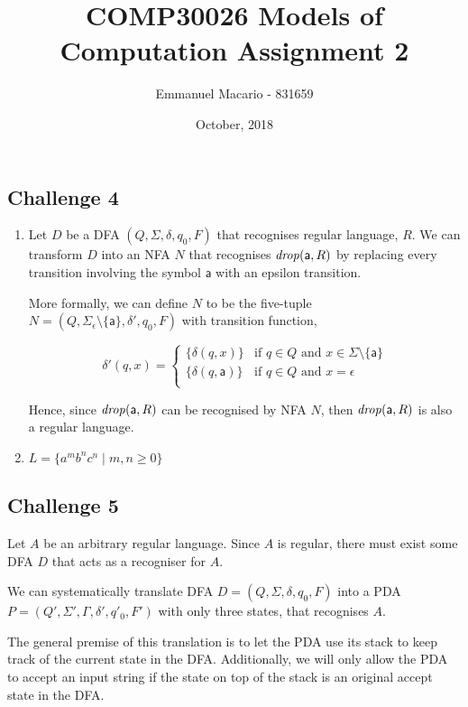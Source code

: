 \documentclass[12pt]{article}
\author{Emmanuel Macario - 831659}
\title{COMP30026 Models of Computation Assignment 2}
\date{October, 2018}
\newcommand{\id}[1]{\mbox{\textit{#1}}}
\newcommand{\ma}{\mathsf{a}}
\begin{document}
\maketitle

\subsection*{Challenge 4}

\begin{enumerate}
\item
Let $D$ be a DFA $(Q,\Sigma,\delta,q_0,F)$ that recognises regular language, $R$. We can transform 
$D$ into an NFA $N$ that recognises $\id{drop}(\ma,R)$ by replacing every transition involving the symbol
$\ma$ with an epsilon transition.

\bigskip
\noindent
More formally, we can define $N$ to be the five-tuple $N=(Q,\Sigma_\epsilon \setminus \{\ma\},\delta',q_0,F)$
with transition function,

\[
  \delta'(q, x) =
  \begin{cases}
  	\{\delta (q, x)\}     & \text{if $q \in Q$ and $x \in \Sigma \setminus \{\ma\}$} \\
      \{\delta (q, \ma)\} & \text{if $q \in Q$ and $x = \epsilon$} \\
  \end{cases}
\]

\bigskip
\noindent
Hence, since $\id{drop}(\ma,R)$ can be recognised by NFA $N$, then $\id{drop}(\ma,R)$ is also a regular language.

\item $L=\{a^m b^n c^n \mid m, n \geq 0\}$
\end{enumerate}


\subsection*{Challenge 5}

Let $A$ be an arbitrary regular language. Since $A$ is regular, there must exist some DFA $D$ that acts as a recogniser for $A$.

\bigskip
\noindent
We can systematically translate DFA $D=(Q,\Sigma,\delta,q_0,F)$ into a PDA $P=(Q',\Sigma',\Gamma,\delta',q'_0,F')$ with only three states, that recognises $A$.

\bigskip
\noindent
The general premise of this translation is to let the PDA use its stack to keep track
of the current state in the DFA. Additionally, we will only allow the PDA to accept 
an input string if the state on top of the stack is an original accept state in the DFA.
\end{document}
